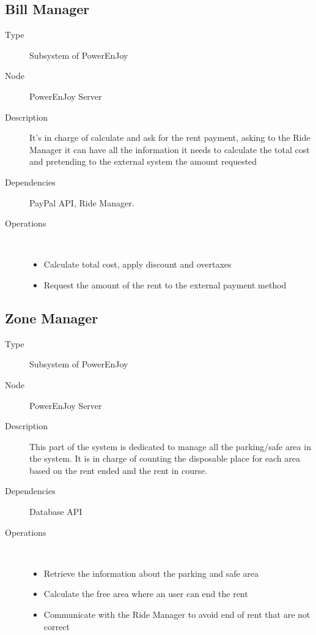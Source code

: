 \subsection{Bill Manager}
\begin{description}
	\item[Type] Subsystem of PowerEnJoy
	\item[Node] PowerEnJoy Server
	\item[Description] It's in charge of calculate and ask for the rent payment, asking to the Ride Manager it can have all the information it needs to calculate the total cost and pretending to the external system the amount requested
	\item[Dependencies] PayPal API, Ride Manager.
	\item[Operations] \ \\
		\begin{itemize}
			\item Calculate total cost, apply discount and overtaxes 
			\item Request the amount of the rent to the external payment method 
		\end{itemize}
\end{description}

\subsection{Zone Manager}
\begin{description}
	\item[Type] Subsystem of PowerEnJoy
	\item[Node] PowerEnJoy Server
	\item[Description] This part of the system is dedicated to manage all the parking/safe area in the system. It is in charge of counting the disposable place for each area based on the rent ended and the rent in course. 
	\item[Dependencies] Database API
	\item[Operations] \ \\
		\begin{itemize}
			\item Retrieve the information about the parking and safe area
			\item Calculate the free area where an user can end the rent 
			\item Communicate with the Ride Manager to avoid end of rent that are not correct
	\end{itemize}
\end{description}

